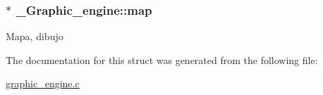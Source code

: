 \subsubsection[{\texorpdfstring{map}{map}}]{$\ast$ \+\_\+\+Graphic\+\_\+engine\+::map}\hypertarget{struct__Graphic__engine_a1ea06bb881d335da8c31d63b3e834bdb}{}\label{struct__Graphic__engine_a1ea06bb881d335da8c31d63b3e834bdb}
Mapa, dibujo 

The documentation for this struct was generated from the following file\+:\begin{DoxyCompactItemize}
\item 
\hyperlink{graphic__engine_8c}{graphic\+\_\+engine.\+c}\end{DoxyCompactItemize}

